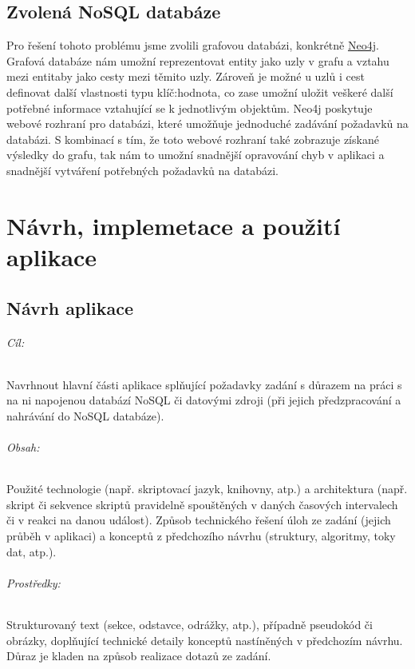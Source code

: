 \documentclass[10pt,xcolor=pdflatex,dvipsnames,table,oneside]{book}
\begin{document}
\chapter{Zvolená NoSQL databáze}
Pro řešení tohoto problému jsme zvolili grafovou databázi, konkrétně \href{https://neo4j.com/}{Neo4j}. Grafová databáze nám umožní
reprezentovat entity jako uzly v grafu a vztahu mezi entitaby jako cesty mezi těmito uzly. Zároveň je možné u uzlů i
cest definovat další vlastnosti typu klíč:hodnota, co zase umožní uložit veškeré další potřebné informace
vztahující se k jednotlivým objektům. Neo4j poskytuje webové rozhraní pro databázi, které umožňuje jednoduché
zadávání požadavků na databázi. S kombinací s tím, že toto webové rozhraní také zobrazuje získané výsledky do
grafu, tak nám to umožní snadnější opravování chyb v aplikaci a snadnější vytváření potřebných požadavků na databázi.

\part{Návrh, implemetace a použití aplikace}

\chapter{Návrh aplikace}
\iffalse
\paragraph{Cíl:}
Navrhnout hlavní části aplikace splňující požadavky zadání s důrazem na práci s na ni napojenou databází NoSQL či datovými zdroji
(při jejich předzpracování a nahrávání do NoSQL databáze).

\paragraph{Obsah:}
Použité technologie (např. skriptovací jazyk, knihovny, atp.)
a architektura (např. skript či sekvence skriptů pravidelně spouštěných v daných časových intervalech či v reakci na danou událost).
Způsob technického řešení úloh ze zadání (jejich průběh v aplikaci) a konceptů z předchozího návrhu (struktury, algoritmy, toky dat, atp.).

\paragraph{Prostředky:}
Strukturovaný text (sekce, odstavce, odrážky, atp.), případně pseudokód či obrázky, doplňující technické detaily konceptů nastíněných v předchozím návrhu.
Důraz je kladen na způsob realizace dotazů ze zadání.
\end{document}
